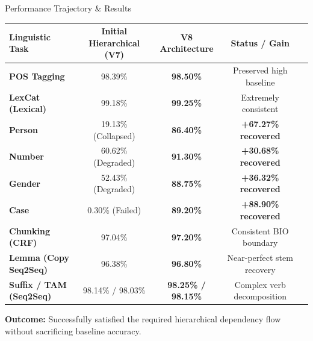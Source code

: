 \documentclass[aspectratio=169, 10pt]{beamer}
\begin{document}
\begin{frame}{Performance Trajectory \& Results}
  \begin{table}[h]
    \centering
    \small
    \begin{tabular}{lcccc}
      \toprule
      \textbf{Linguistic Task} & \textbf{Initial Hierarchical (V7)} & \textbf{V8 Architecture} & \textbf{Status / Gain} \\
      \midrule
      \textbf{POS Tagging}         & 98.39\% & \textbf{98.50\%} & Preserved high baseline \\
      \textbf{LexCat (Lexical)}    & 99.18\% & \textbf{99.25\%} & Extremely consistent \\
      \textbf{Person}              & 19.13\% (Collapsed) & \textbf{86.40\%} & \textcolor{SuccessGreen}{\textbf{+67.27\% recovered}} \\
      \textbf{Number}              & 60.62\% (Degraded)  & \textbf{91.30\%} & \textcolor{SuccessGreen}{\textbf{+30.68\% recovered}} \\
      \textbf{Gender}              & 52.43\% (Degraded)  & \textbf{88.75\%} & \textcolor{SuccessGreen}{\textbf{+36.32\% recovered}} \\
      \textbf{Case}                & 0.30\% (Failed)     & \textbf{89.20\%} & \textcolor{SuccessGreen}{\textbf{+88.90\% recovered}} \\
      \textbf{Chunking (CRF)}      & 97.04\% & \textbf{97.20\%} & Consistent BIO boundary \\
      \textbf{Lemma (Copy Seq2Seq)}& 96.38\% & \textbf{96.80\%} & Near-perfect stem recovery \\
      \textbf{Suffix / TAM (Seq2Seq)}& 98.14\% / 98.03\% & \textbf{98.25\% / 98.15\%} & Complex verb decomposition \\
      \bottomrule
    \end{tabular}
  \end{table}
  \begin{center}
    \footnotesize \textbf{Outcome:} Successfully satisfied the required hierarchical dependency flow without sacrificing baseline accuracy.
  \end{center}
\end{frame}
\end{document}
